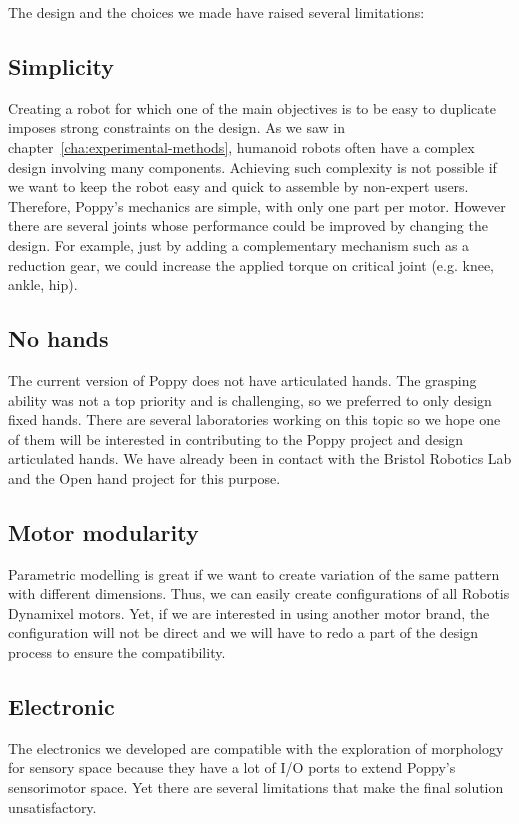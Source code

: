 The design and the choices we made have raised several limitations:

\subsection{Simplicity} %
Creating a robot  for which one of the main objectives is to be easy to duplicate imposes strong constraints on the design. As we saw in chapter~\ref{cha:experimental-methods}, humanoid robots often have a complex design involving many components. Achieving such complexity is not possible if we want to keep the robot easy and quick to assemble by non-expert users. Therefore, Poppy's mechanics are simple, with only one part per motor. However there are several joints whose performance could be improved by changing the design. For example, just by adding a complementary mechanism such as a reduction gear, we could increase the applied torque on critical joint (e.g. knee, ankle, hip).

\subsection{No hands} %
The current version of Poppy does not have articulated hands. The grasping ability was not a top priority and is challenging, so we preferred to only design fixed hands. There are several laboratories working on this topic so we hope one of them will be interested in contributing to the Poppy project and design articulated hands. We have already been in contact with the Bristol Robotics Lab and the Open hand project for this purpose.

\subsection{Motor modularity} %
Parametric modelling is great if we want to create variation of the same pattern with different dimensions. Thus, we can easily create configurations of all Robotis Dynamixel motors. Yet, if we are interested in using another motor brand, the configuration will not be direct and we will have to redo a part of the design process to ensure the compatibility.


\subsection{Electronic} %
\label{sub:electronic-limitations}

The electronics we developed are compatible with the exploration of morphology for sensory space because they have a lot of I/O ports to extend Poppy's sensorimotor space. Yet there are several limitations that make the final solution unsatisfactory.


